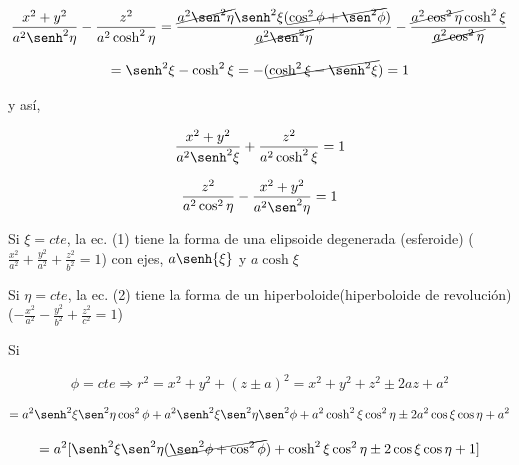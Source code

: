 \documentclass[12pt,a4paper]{article}
\begin{document}
\begin{enumerate}
\begin{enumerate}
        \begin{equation*}
            \frac{x^2 + y^2}{a^2 \senh^2{\eta}} - \frac{z^2}{a^2 \cosh^2{\eta}} = \frac{\cancel{a^2 \sen^2{\eta}} \senh^2{\xi} (\cancel{\cos^2{\phi} + \sen^2{\phi}})}{\cancel{a^2 \sen^2{\eta}}} - \frac{\cancel{a^2 \cos^2{\eta}} \cosh^2{\xi}}{\cancel{a^2 \cos^2{\eta}}}
        \end{equation*}
        
        \begin{equation*}
            = \senh^2{\xi} - \cosh^2{\xi} = -(\cancel{\cosh^2{\xi} - \senh^2{\xi}}) = 1
        \end{equation*}
        
        y así,
        
        \begin{equation}
            \frac{x^2 + y^2}{a^2 \senh^2{\xi}} + \frac{z^2}{a^2 \cosh^2{\xi}} = 1
        \end{equation}
        
        \begin{equation}
            \frac{z^2}{a^2 \cos^2{\eta}} - \frac{x^2 + y^2}{a^2 \sen^2{\eta}} = 1
        \end{equation}
        
        Si $\xi = cte$, la ec. (1) tiene la forma de una elipsoide degenerada (esferoide) ($\frac{x^2}{a^2} + \frac{y^2}{a^2} + \frac{z^2}{b^2} = 1$) con ejes, $a \senh{\xi}$ y $a \cosh{\xi}$
        
        Si $\eta = cte$, la ec. (2) tiene la forma de un hiperboloide(hiperboloide de revolución) ($- \frac{x^2}{a^2} - \frac{y^2}{b^2} + \frac{z^2}{c^2} = 1$)
        
        Si
        
        \begin{equation*}
            \phi = cte   \Rightarrow r^2 = x^2 + y^2 + (z\pm a)^2 = x^2 + y^2 +z^2 \pm 2az + a^2
        \end{equation*}
        
        \begin{equation*}
            = a^2 \senh^2{\xi} \sen^2{\eta} \cos^2{\phi} +a^2 \senh^2{\xi} \sen^2{\eta} \sen^2{\phi}+ a^2 \cosh^2{\xi} \cos^2{\eta} \pm 2a^2 \cos{\xi} \cos{\eta} + a^2 
        \end{equation*}
        
        \begin{equation*}
            =a^2 [\senh^2{\xi} \sen^2{\eta}(\cancel{\sen^2{\phi}+\cos^2{\phi}})+ \cosh^2{\xi} \cos^2{\eta} \pm 2\cos{\xi} \cos{\eta}+1]
        \end{equation*}
        

\end{enumerate}
\end{enumerate}
\end{document}
